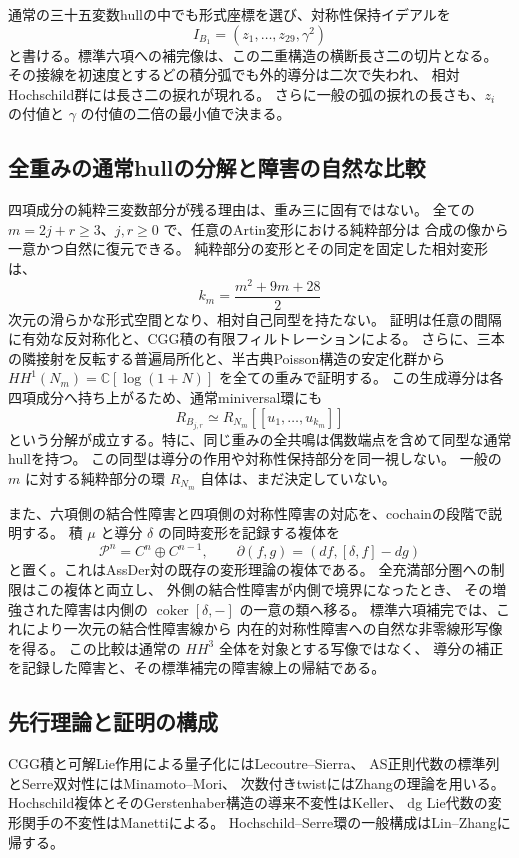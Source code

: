 通常の三十五変数hullの中でも形式座標を選び、対称性保持イデアルを
\[
 I_{B_1}=(z_1,\ldots,z_{29},\gamma^2)
\]
と書ける。標準六項への補完像は、この二重構造の横断長さ二の切片となる。
その接線を初速度とするどの積分弧でも外的導分は二次で失われ、
相対Hochschild群には長さ二の捩れが現れる。
さらに一般の弧の捩れの長さも、$z_i$ の付値と $\gamma$ の付値の二倍の最小値で決まる。

\subsection{全重みの通常hullの分解と障害の自然な比較}

四項成分の純粋三変数部分が残る理由は、重み三に固有ではない。
全ての $m=2j+r\ge3$、$j,r\ge0$ で、任意のArtin変形における純粋部分は
合成の像から一意かつ自然に復元できる。
純粋部分の変形とその同定を固定した相対変形は、
\[
 k_m=\frac{m^2+9m+28}{2}
\]
次元の滑らかな形式空間となり、相対自己同型を持たない。
証明は任意の間隔に有効な反対称化と、CGG積の有限フィルトレーションによる。
さらに、三本の隣接射を反転する普遍局所化と、半古典Poisson構造の安定化群から
$HH^1(N_m)=\mathbb C[\log(1+N)]$ を全ての重みで証明する。
この生成導分は各四項成分へ持ち上がるため、通常miniversal環にも
\[
 R_{B_{j,r}}\simeq R_{N_m}[[u_1,\ldots,u_{k_m}]]
\]
という分解が成立する。特に、同じ重みの全共鳴は偶数端点を含めて同型な通常hullを持つ。
この同型は導分の作用や対称性保持部分を同一視しない。
一般の $m$ に対する純粋部分の環 $R_{N_m}$ 自体は、まだ決定していない。

また、六項側の結合性障害と四項側の対称性障害の対応を、cochainの段階で説明する。
積 $\mu$ と導分 $\delta$ の同時変形を記録する複体を
\[
 \mathcal P^n=C^n\oplus C^{n-1},\qquad
 \partial(f,g)=(df,[\delta,f]-dg)
\]
と置く。これはAssDer対の既存の変形理論\cite{DasMandal2026}の複体である。
全充満部分圏への制限はこの複体と両立し、
外側の結合性障害が内側で境界になったとき、
その増強された障害は内側の $\operatorname{coker}[\delta,-]$ の一意の類へ移る。
標準六項補完では、これにより一次元の結合性障害線から
内在的対称性障害への自然な非零線形写像を得る。
この比較は通常の $HH^3$ 全体を対象とする写像ではなく、
導分の補正を記録した障害と、その標準補完の障害線上の帰結である。

\subsection{先行理論と証明の構成}

CGG積と可解Lie作用による量子化にはLecoutre--Sierra\cite{LecoutreSierra2019}、
AS正則代数の標準列とSerre双対性にはMinamoto--Mori\cite{MinamotoMori2011}、
次数付きtwistにはZhang\cite{Zhang1996}の理論を用いる。
Hochschild複体とそのGerstenhaber構造の導来不変性はKeller\cite{KellerDerived2003}、
dg Lie代数の変形関手の不変性はManetti\cite{Manetti2005}による。
Hochschild--Serre環の一般構成はLin--Zhang\cite{LinZhangSerre2025}に帰する。

